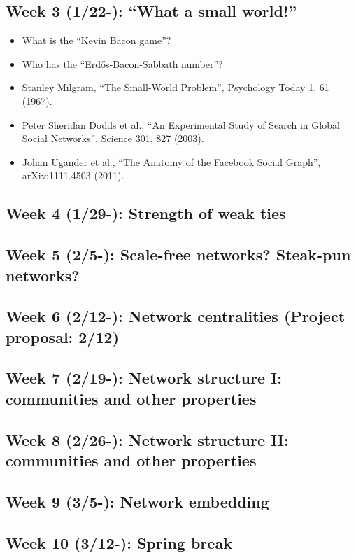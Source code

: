 \documentclass[11pt,article,oneside]{memoir} %
\begin{document}
\subsection{Week 3 (1/22-):  ``What a small world!''}
\vspace{-0.2em}\begin{itemize}\itemsep0em
\item What is the ``Kevin Bacon game''?
\item Who has the ``Erdős-Bacon-Sabbath number''?
\item Stanley Milgram, ``The Small-World Problem'', Psychology Today 1, 61 (1967).
\item Peter Sheridan Dodds et al., ``An Experimental Study of Search in Global Social Networks'', Science 301, 827 (2003).
\item Johan Ugander et al., ``The Anatomy of the Facebook Social Graph'', arXiv:1111.4503 (2011).
\end{itemize}

\subsection{Week 4 (1/29-):  Strength of weak ties}
\subsection{Week 5 (2/5-):  Scale-free networks? Steak-pun networks?}
\subsection{Week 6 (2/12-):  Network centralities (Project proposal: 2/12)}
\subsection{Week 7 (2/19-):  Network structure I: communities and other properties}
\subsection{Week 8 (2/26-):  Network structure II: communities and other properties}
\subsection{Week 9 (3/5-):  Network embedding}
\subsection{\color{gray}Week 10 (3/12-): Spring break}
\end{document}
